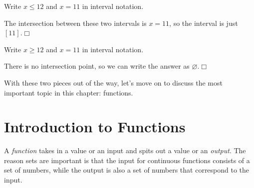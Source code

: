 \documentclass[lang=en,11pt]{elegantbook}
\begin{document}
\begin{example}
Write $x\leq 12$ and $x=11$ in interval notation.
\end{example}
\begin{solution}
The intersection between these two intervals is $x=11$, so the interval is just $[11]$.$\Box$
\end{solution}
\begin{example}
Write $x\geq 12$ and $x=11$ in interval notation.
\end{example}
\begin{solution}
There is no intersection point, so we can write the answer as $\varnothing$.$\Box$
\end{solution}
\noindent With these two pieces out of the way, let's move on to discuss the most important topic in this chapter: functions.
\section{Introduction to Functions}
\noindent A \textit{function} takes in a value or an input and spits out a value or an \textit{output}.  The reason sets are important is that the input for continuous functions consists of a set of numbers, while the output is also a set of numbers that correspond to the input.
\end{document}
